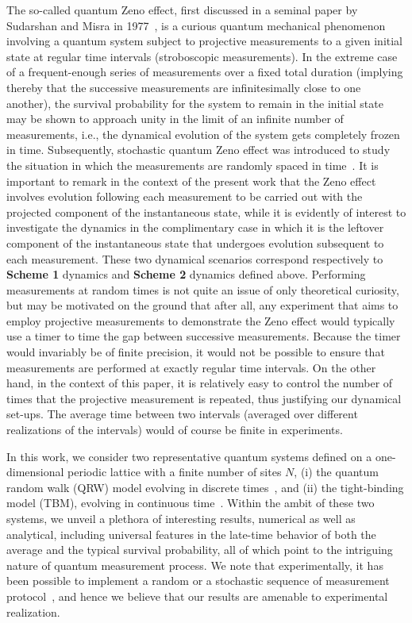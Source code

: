 \documentclass[12pt]{iopart}
\begin{document}
The so-called quantum Zeno effect, first discussed in a seminal paper by
Sudarshan and Misra in 1977~\cite{Misra:1977}, is a curious quantum mechanical phenomenon
involving a quantum system subject to projective measurements to a given
initial state at regular time intervals (stroboscopic measurements). In the extreme case of a
frequent-enough series of measurements over a fixed total duration
(implying thereby that the successive measurements are infinitesimally
close to one another), the survival probability for the system to remain
in the initial state may be shown to approach unity in the limit of an
infinite number of measurements, i.e., the dynamical evolution of the
system gets completely frozen in time. Subsequently, stochastic quantum
Zeno effect was
introduced to study the situation in which the measurements are randomly
spaced in time~\cite{Gherardini:2016}. It is important to remark in the context of the present
work that the Zeno effect involves evolution following each measurement
to be carried out with the projected component of the instantaneous
state, while it is evidently of interest to
investigate the dynamics in the complimentary case in which it is the
leftover component of the instantaneous state that undergoes
evolution subsequent to each measurement. These two dynamical scenarios
correspond respectively to {\bf Scheme 1} dynamics and {\bf Scheme 2}
dynamics defined above. Performing measurements at random times is not
quite an
issue of only theoretical curiosity, but may be motivated on the ground that
after all, any experiment that aims to employ projective measurements to
demonstrate the Zeno effect would typically use a timer to time the gap
between successive measurements. Because the timer would invariably be
of finite precision, it would not be possible to ensure that
measurements are performed at exactly regular time
intervals. On the
other hand, in the context of this paper, it is relatively easy to
control the number of times that the projective measurement is repeated,
thus justifying our dynamical set-ups. The average time between two
intervals (averaged over different realizations of the intervals) would of course be finite in experiments.   

In
this work,  we consider two
representative quantum systems defined on a one-dimensional periodic lattice with a finite number of sites $N$,  (i) the quantum
random walk (QRW) model evolving in discrete
times~\cite{qua-Aharonov:1993}, and (ii) the
tight-binding model (TBM), evolving in continuous
time~\cite{qua-Dunlap:1986,qua-Dunlap:1988}.  Within the ambit of these two systems,  we
unveil a plethora of interesting results, numerical as well as analytical,
including universal features in the late-time behavior of both the
average and the typical survival probability, all
of which point to the intriguing nature of quantum measurement process.  We note that experimentally,  it has been possible to implement a random or a stochastic sequence of measurement protocol~\cite{Gherardini:2016,Muller:2017,Gherardini:2017,Gherardini:2018,Do:2019}, and hence we believe that our results are amenable to experimental realization. 
\end{document}
